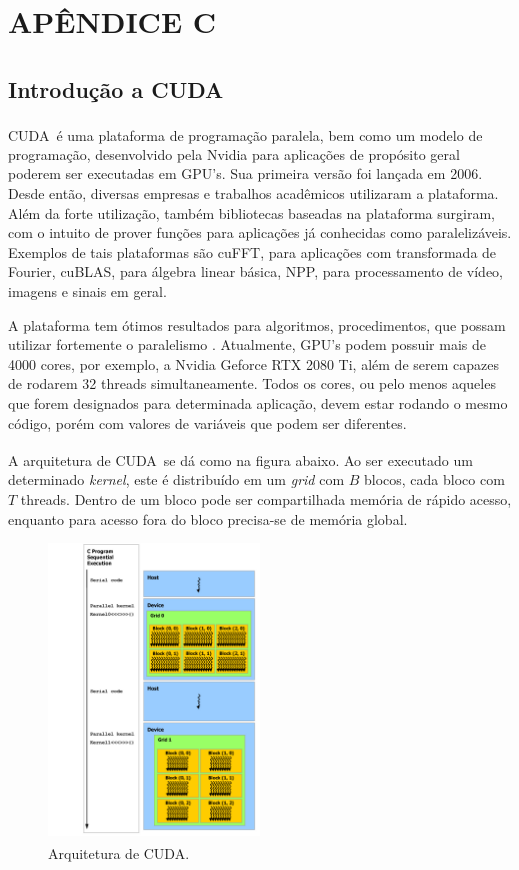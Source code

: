 \documentclass[cic,tc]{iiufrgs}
\newcommand{\reg}{\textsuperscript{\textregistered}}
\begin{document}
\chapter*{APÊNDICE C}
\section*{Introdução a CUDA\reg}
CUDA\reg~é uma plataforma de programação paralela, bem como um modelo de programação, 
desenvolvido pela Nvidia para aplicações de propósito geral poderem ser executadas
em GPU's.
Sua primeira versão foi lançada em 2006.
Desde então, diversas empresas e trabalhos acadêmicos utilizaram a plataforma.
Além da forte utilização, também bibliotecas baseadas na plataforma surgiram, 
com o intuito de prover funções para aplicações já conhecidas como paralelizáveis.
Exemplos de tais plataformas são cuFFT, para aplicações com transformada de Fourier,
cuBLAS, para álgebra linear básica, NPP, para processamento de vídeo, imagens e 
sinais em geral.

A plataforma tem ótimos resultados para algoritmos, procedimentos, que possam utilizar
fortemente o paralelismo \cite{CUDAMAIN}.
Atualmente, GPU's podem possuir mais de 4000 cores, por exemplo, a Nvidia Geforce RTX 2080 Ti,
além de serem capazes de rodarem 32 threads simultaneamente.
Todos os cores, ou pelo menos aqueles que forem designados para determinada aplicação,
devem estar rodando o mesmo código, porém com valores de variáveis que podem ser diferentes.

A arquitetura de CUDA\reg~se dá como na figura abaixo.
Ao ser executado um determinado \textit{kernel}, este é distribuído em um \textit{grid}
com $B$ blocos, cada bloco com $T$ threads.
Dentro de um bloco pode ser compartilhada memória de rápido acesso, enquanto para 
acesso fora do bloco precisa-se de memória global.
\begin{figure}[H]
    \caption{Arquitetura de CUDA\reg.}
    \begin{center}
        \includegraphics[width=0.5\textwidth]{img/CUDAarch.png}
    \end{center}
\end{figure}
\end{document}
